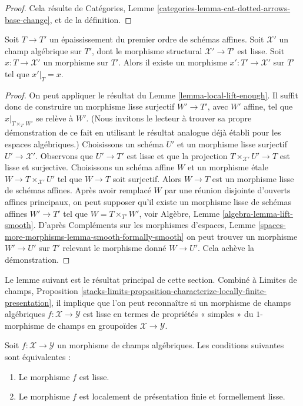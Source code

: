 \begin{proof}
Cela résulte de
Catégories, Lemme \ref{categories-lemma-cat-dotted-arrows-base-change},
et de la définition.
\end{proof}

\begin{lemma}
\label{lemma-lift-to-smooth}
Soit $T \to T'$ un épaississement du premier ordre de schémas affines.
Soit $\mathcal{X}'$ un champ algébrique sur $T'$,
dont le morphisme structural $\mathcal{X}' \to T'$ est lisse.
Soit $x : T \to \mathcal{X}'$ un morphisme
sur $T'$. Alors il existe un morphisme $x' : T' \to \mathcal{X}'$
sur $T'$ tel que $x'|_T = x$.
\end{lemma}

\begin{proof}
On peut appliquer le résultat du Lemme \ref{lemma-local-lift-enough}.
Il suffit donc de construire un morphisme lisse surjectif
$W' \to T'$, avec $W'$ affine, tel que
$x|_{T \times_{T'} W'}$ se relève à $W'$.
(Nous invitons le lecteur à trouver sa propre démonstration de ce fait
en utilisant le résultat analogue déjà établi
pour les espaces algébriques.) Choisissons un
schéma $U'$ et un morphisme lisse surjectif $U' \to \mathcal{X}'$.
Observons que $U' \to T'$ est lisse et que la projection
$T \times_{\mathcal{X}'} U' \to T$ est lisse et surjective.
Choisissons un schéma affine $W$ et un morphisme \'etale
$W \to T \times_{\mathcal{X}'} U'$ tel que $W \to T$
soit surjectif. Alors $W \to T$ est un morphisme lisse de
schémas affines. Après avoir remplacé $W$ par une réunion disjointe d'ouverts
affines principaux, on peut supposer qu'il existe un
morphisme lisse de schémas affines $W' \to T'$ tel que
$W = T \times_{T'} W'$, voir Algèbre, Lemme \ref{algebra-lemma-lift-smooth}.
D'après Compléments sur les morphismes d'espaces, Lemme
\ref{spaces-more-morphisms-lemma-smooth-formally-smooth}
on peut trouver un morphisme $W' \to U'$ sur $T'$ relevant
le morphisme donné $W \to U'$. Cela achève la démonstration.
\end{proof}

\noindent
Le lemme suivant est le résultat principal de cette section.
Combiné à
Limites de champs, Proposition
\ref{stacks-limits-proposition-characterize-locally-finite-presentation},
il implique que l'on peut reconnaître si un morphisme de champs algébriques
$f : \mathcal{X} \to \mathcal{Y}$ est lisse en termes de
propriétés « simples » du $1$-morphisme de champs en groupoïdes
$\mathcal{X} \to \mathcal{Y}$.

\begin{lemma}
\label{lemma-smooth-formally-smooth}
Soit $f : \mathcal{X} \to \mathcal{Y}$ un morphisme de champs algébriques.
Les conditions suivantes sont équivalentes :
\begin{enumerate}
\item Le morphisme $f$ est lisse.
\item Le morphisme $f$ est localement de présentation finie et
formellement lisse.
\end{enumerate}
\end{lemma}

